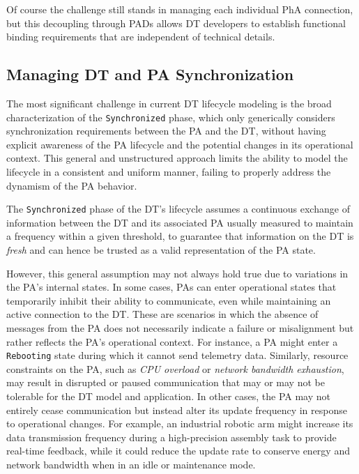 Of course the challenge still stands in managing each individual \ac{PhA} connection, but this decoupling through \acp{PAD} allows \ac{DT} developers to establish functional binding requirements that are independent of technical details. 

\subsection{Managing DT and PA Synchronization}


The most significant challenge in current \ac{DT} lifecycle modeling is the broad characterization of the \texttt{Synchronized} phase, which
only generically considers synchronization requirements between the \ac{PA} and the \ac{DT}, without having explicit awareness of the \ac{PA} lifecycle and the potential changes in its operational context.
This general and unstructured approach limits the ability to model the lifecycle in a consistent and uniform manner, failing to properly address the dynamism of the \ac{PA} behavior.

The \texttt{Synchronized} phase of the \ac{DT}'s lifecycle assumes a continuous exchange of information between the \ac{DT} and its associated \ac{PA} usually measured to maintain a frequency within a given threshold, to guarantee that information on the \ac{DT} is \emph{fresh} and can hence be trusted as a valid representation of the \ac{PA} state. 

However, this general assumption may not always hold true due to variations in the \ac{PA}'s internal states.
%
In some cases, \acp{PA} can enter operational states that temporarily inhibit their ability to communicate, even while maintaining an active connection to the \ac{DT}.
These are scenarios in which the absence of messages from the \ac{PA} does not necessarily indicate a failure or misalignment but rather reflects the \ac{PA}'s operational context.
For instance, a \ac{PA} might enter a \texttt{Rebooting} state during which it cannot send telemetry data.
Similarly, resource constraints on the \ac{PA}, such as \textit{CPU overload} or \textit{network bandwidth exhaustion}, may result in disrupted or paused communication that may or may not be tolerable for the \ac{DT} model and application.
%
In other cases, the \ac{PA} may not entirely cease communication but instead alter its update frequency in response to operational changes. For example, an industrial robotic arm might increase its data transmission frequency during a high-precision assembly task to provide real-time feedback, while it could reduce the update rate to conserve energy and network bandwidth when in an idle or maintenance mode.


